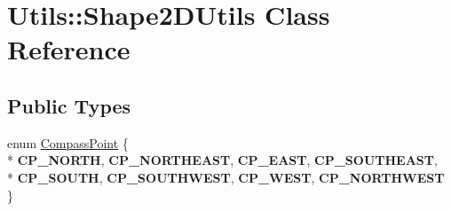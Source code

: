 \hypertarget{class_utils_1_1_shape2_d_utils}{}\section{Utils\+:\+:Shape2\+D\+Utils Class Reference}
\label{class_utils_1_1_shape2_d_utils}
\subsection*{Public Types}
\begin{DoxyCompactItemize}
\item 
enum \hyperlink{class_utils_1_1_shape2_d_utils_a94cfd04764b56fdc1c43325fb8666cf5}{Compass\+Point} \{ \\*
{\bfseries C\+P\+\_\+\+N\+O\+R\+TH}, 
{\bfseries C\+P\+\_\+\+N\+O\+R\+T\+H\+E\+A\+ST}, 
{\bfseries C\+P\+\_\+\+E\+A\+ST}, 
{\bfseries C\+P\+\_\+\+S\+O\+U\+T\+H\+E\+A\+ST}, 
\\*
{\bfseries C\+P\+\_\+\+S\+O\+U\+TH}, 
{\bfseries C\+P\+\_\+\+S\+O\+U\+T\+H\+W\+E\+ST}, 
{\bfseries C\+P\+\_\+\+W\+E\+ST}, 
{\bfseries C\+P\+\_\+\+N\+O\+R\+T\+H\+W\+E\+ST}
 \}
\end{DoxyCompactItemize}
